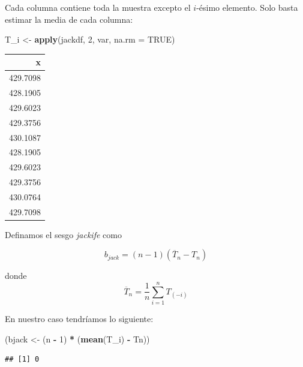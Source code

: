 \documentclass[
  12pt,
]{book}
\newenvironment{Shaded}{\begin{snugshade}}{\end{snugshade}}
\newcommand{\DataTypeTok}[1]{\textcolor[rgb]{0.13,0.29,0.53}{#1}}
\newcommand{\DecValTok}[1]{\textcolor[rgb]{0.00,0.00,0.81}{#1}}
\newcommand{\KeywordTok}[1]{\textcolor[rgb]{0.13,0.29,0.53}{\textbf{#1}}}
\newcommand{\NormalTok}[1]{#1}
\newcommand{\OperatorTok}[1]{\textcolor[rgb]{0.81,0.36,0.00}{\textbf{#1}}}
\newcommand{\OtherTok}[1]{\textcolor[rgb]{0.56,0.35,0.01}{#1}}
\newcommand{\StringTok}[1]{\textcolor[rgb]{0.31,0.60,0.02}{#1}}
\theoremstyle{definition}
\theoremstyle{definition}
\theoremstyle{definition}
\theoremstyle{remark}
\let\BeginKnitrBlock\begin \let\EndKnitrBlock\end
\begin{document}
Cada columna contiene toda la muestra excepto el \(i\)-ésimo
elemento. Solo basta estimar la media de cada columna:

\begin{Shaded}
\begin{Highlighting}[]
\NormalTok{T_i <-}\StringTok{ }\KeywordTok{apply}\NormalTok{(jackdf, }\DecValTok{2}\NormalTok{, var, }\DataTypeTok{na.rm =} \OtherTok{TRUE}\NormalTok{)}
\end{Highlighting}
\end{Shaded}

\begin{tabular}{r}
\hline
x\\
\hline
429.7098\\
\hline
428.1905\\
\hline
429.6023\\
\hline
429.3756\\
\hline
430.1087\\
\hline
428.1905\\
\hline
429.6023\\
\hline
429.3756\\
\hline
430.0764\\
\hline
429.7098\\
\hline
\end{tabular}

Definamos el sesgo \emph{jackife} como

\begin{equation*}
b_{jack} = (n-1) (\overline{T}_{n} - T_{n})
\end{equation*}

donde
\begin{equation*}
\overline{T}_{n} = \frac{1}{n} \sum_{i=1}^{n} T_{(-i)}
\end{equation*}

\BeginKnitrBlock{exercise}
\protect\hypertarget{exr:unnamed-chunk-71}{}{\label{exr:unnamed-chunk-71} }En nuestro caso tendríamos lo siguiente:
\EndKnitrBlock{exercise}

\begin{Shaded}
\begin{Highlighting}[]
\NormalTok{(bjack <-}\StringTok{ }\NormalTok{(n }\OperatorTok{-}\StringTok{ }\DecValTok{1}\NormalTok{) }\OperatorTok{*}\StringTok{ }\NormalTok{(}\KeywordTok{mean}\NormalTok{(T_i) }\OperatorTok{-}\StringTok{ }\NormalTok{Tn))}
\end{Highlighting}
\end{Shaded}

\begin{verbatim}
## [1] 0
\end{verbatim}
\end{document}

